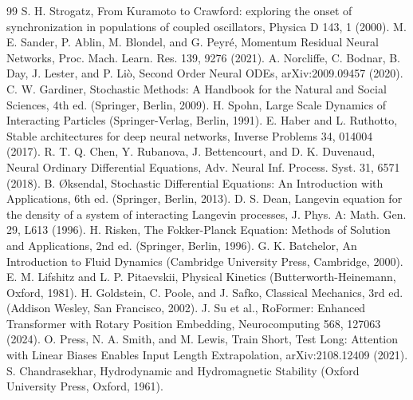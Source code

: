 \documentclass[10pt]{article}
\begin{document}
\begin{thebibliography}{99}
 S. H. Strogatz, From Kuramoto to Crawford: exploring the onset of synchronization in populations of coupled oscillators, Physica D 143, 1 (2000).
 M. E. Sander, P. Ablin, M. Blondel, and G. Peyré, Momentum Residual Neural Networks, Proc. Mach. Learn. Res. 139, 9276 (2021).
 A. Norcliffe, C. Bodnar, B. Day, J. Lester, and P. Liò, Second Order Neural ODEs, arXiv:2009.09457 (2020).
 C. W. Gardiner, Stochastic Methods: A Handbook for the Natural and Social Sciences, 4th ed. (Springer, Berlin, 2009).
 H. Spohn, Large Scale Dynamics of Interacting Particles (Springer-Verlag, Berlin, 1991).
 E. Haber and L. Ruthotto, Stable architectures for deep neural networks, Inverse Problems 34, 014004 (2017).
 R. T. Q. Chen, Y. Rubanova, J. Bettencourt, and D. K. Duvenaud, Neural Ordinary Differential Equations, Adv. Neural Inf. Process. Syst. 31, 6571 (2018).
 B. Øksendal, Stochastic Differential Equations: An Introduction with Applications, 6th ed. (Springer, Berlin, 2013).
 D. S. Dean, Langevin equation for the density of a system of interacting Langevin processes, J. Phys. A: Math. Gen. 29, L613 (1996).
 H. Risken, The Fokker-Planck Equation: Methods of Solution and Applications, 2nd ed. (Springer, Berlin, 1996).
 G. K. Batchelor, An Introduction to Fluid Dynamics (Cambridge University Press, Cambridge, 2000).
 E. M. Lifshitz and L. P. Pitaevskii, Physical Kinetics (Butterworth-Heinemann, Oxford, 1981).
 H. Goldstein, C. Poole, and J. Safko, Classical Mechanics, 3rd ed. (Addison Wesley, San Francisco, 2002).
 J. Su et al., RoFormer: Enhanced Transformer with Rotary Position Embedding, Neurocomputing 568, 127063 (2024).
 O. Press, N. A. Smith, and M. Lewis, Train Short, Test Long: Attention with Linear Biases Enables Input Length Extrapolation, arXiv:2108.12409 (2021).
 S. Chandrasekhar, Hydrodynamic and Hydromagnetic Stability (Oxford University Press, Oxford, 1961).

\end{thebibliography}
\end{document}
